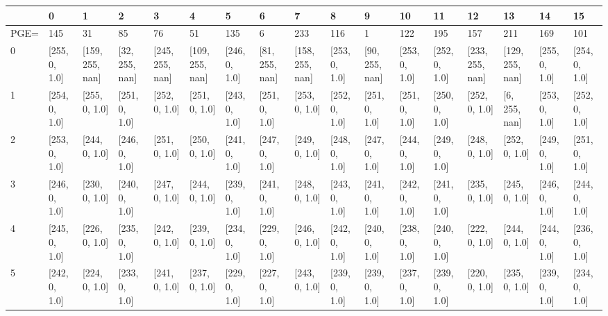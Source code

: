 \begin{tabular}{lllllllllllllllll}
\toprule
{} &             0  &               1  &              2  &               3  &               4  &             5  &              6  &               7  &             8  &              9  &             10 &             11 &               12 &               13 &             14 &             15 \\
\midrule
PGE= &            145 &               31 &              85 &               76 &               51 &            135 &               6 &              233 &            116 &               1 &            122 &            195 &              157 &              211 &            169 &            101 \\
0    &  [255, 0, 1.0] &  [159, 255, nan] &  [32, 255, nan] &  [245, 255, nan] &  [109, 255, nan] &  [246, 0, 1.0] &  [81, 255, nan] &  [158, 255, nan] &  [253, 0, 1.0] &  [90, 255, nan] &  [253, 0, 1.0] &  [252, 0, 1.0] &  [233, 255, nan] &  [129, 255, nan] &  [255, 0, 1.0] &  [254, 0, 1.0] \\
1    &  [254, 0, 1.0] &    [255, 0, 1.0] &   [251, 0, 1.0] &    [252, 0, 1.0] &    [251, 0, 1.0] &  [243, 0, 1.0] &   [251, 0, 1.0] &    [253, 0, 1.0] &  [252, 0, 1.0] &   [251, 0, 1.0] &  [251, 0, 1.0] &  [250, 0, 1.0] &    [252, 0, 1.0] &    [6, 255, nan] &  [253, 0, 1.0] &  [252, 0, 1.0] \\
2    &  [253, 0, 1.0] &    [244, 0, 1.0] &   [246, 0, 1.0] &    [251, 0, 1.0] &    [250, 0, 1.0] &  [241, 0, 1.0] &   [247, 0, 1.0] &    [249, 0, 1.0] &  [248, 0, 1.0] &   [247, 0, 1.0] &  [244, 0, 1.0] &  [249, 0, 1.0] &    [248, 0, 1.0] &    [252, 0, 1.0] &  [249, 0, 1.0] &  [251, 0, 1.0] \\
3    &  [246, 0, 1.0] &    [230, 0, 1.0] &   [240, 0, 1.0] &    [247, 0, 1.0] &    [244, 0, 1.0] &  [239, 0, 1.0] &   [241, 0, 1.0] &    [248, 0, 1.0] &  [243, 0, 1.0] &   [241, 0, 1.0] &  [242, 0, 1.0] &  [241, 0, 1.0] &    [235, 0, 1.0] &    [245, 0, 1.0] &  [246, 0, 1.0] &  [244, 0, 1.0] \\
4    &  [245, 0, 1.0] &    [226, 0, 1.0] &   [235, 0, 1.0] &    [242, 0, 1.0] &    [239, 0, 1.0] &  [234, 0, 1.0] &   [229, 0, 1.0] &    [246, 0, 1.0] &  [242, 0, 1.0] &   [240, 0, 1.0] &  [238, 0, 1.0] &  [240, 0, 1.0] &    [222, 0, 1.0] &    [244, 0, 1.0] &  [244, 0, 1.0] &  [236, 0, 1.0] \\
5    &  [242, 0, 1.0] &    [224, 0, 1.0] &   [233, 0, 1.0] &    [241, 0, 1.0] &    [237, 0, 1.0] &  [229, 0, 1.0] &   [227, 0, 1.0] &    [243, 0, 1.0] &  [239, 0, 1.0] &   [239, 0, 1.0] &  [237, 0, 1.0] &  [239, 0, 1.0] &    [220, 0, 1.0] &    [235, 0, 1.0] &  [239, 0, 1.0] &  [234, 0, 1.0] \\

\end{tabular}
